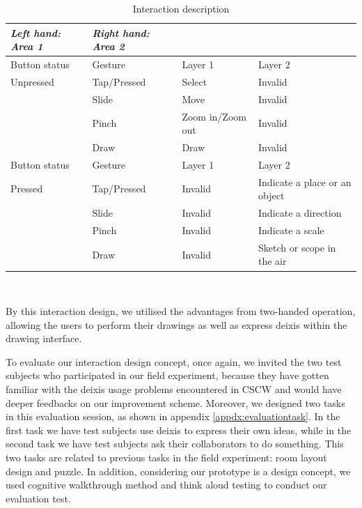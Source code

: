 \documentclass[12pt,twoside]{article}
\begin{document}
\begin{table}
  \centering
  \begin{tabular}{l l l l}
    {\small\textit{Left hand: Area 1}}
    & {\small \textit{Right hand: Area 2}}
    & {\small \textit{ }} 
    & {\small \textit{ }} \\
    \midrule
    Button status & Gesture & Layer 1 & Layer 2 \\
     \midrule
       Unpressed & Tap/Pressed & Select & Invalid \\
       & Slide & Move & Invalid \\
       & Pinch & Zoom in/Zoom out & Invalid \\
       & Draw & Draw & Invalid \\
     \midrule
    Button status & Gesture & Layer 1 & Layer 2 \\
     \midrule
     Pressed  & Tap/Pressed & Invalid & Indicate a place or an object \\
       & Slide & Invalid & Indicate a direction \\
       & Pinch & Invalid & Indicate a scale \\
       & Draw & Invalid & Sketch or scope in the air \\
  \end{tabular}
  \caption{Interaction description}~\label{tab:design1_b}
\end{table}

By this interaction design, we utilised the advantages from two-handed operation, allowing the users to perform their drawings as well as express deixis within the drawing interface.

To evaluate our interaction design concept, once again, we invited the two test subjects who participated in our field experiment, because they have gotten familiar with the deixis usage problems encountered in CSCW and would have deeper feedbacks on our improvement scheme. Moreover, we designed two tasks in this evaluation session, as shown in appendix \ref{appdx:evaluationtask}. In the first task we have test subjects use deixis to express their own ideas, while in the second task we have test subjects ask their collaborators to do something. This two tasks are related to previous tasks in the field experiment: room layout design and puzzle. In addition, considering our prototype is a design concept, we used cognitive walkthrough method \cite{polson1992cognitive} and think aloud testing \cite{boren2000thinking} to conduct our evaluation test.
\end{document}
